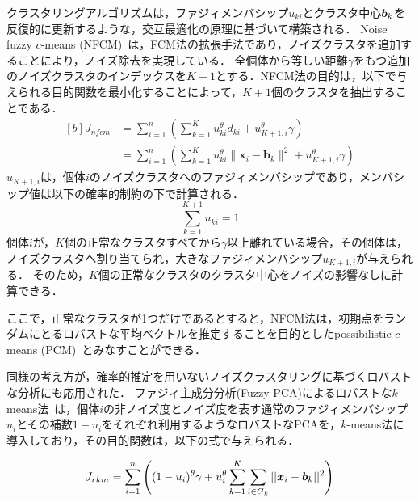 \documentclass{ujarticle}
\begin{document}
クラスタリングアルゴリズムは，ファジィメンバシップ$u_{ki}$とクラスタ中心$\mbox{\boldmath $b$}_k$を反復的に更新するような，交互最適化の原理に基づいて構築される．
Noise fuzzy $c$-means (NFCM)~\cite{Dave91,Dave97}は，FCM法の拡張手法であり，ノイズクラスタを追加することにより，ノイズ除去を実現している．
全個体から等しい距離$\gamma$をもつ追加のノイズクラスタのインデックスを$K+1$とする．NFCM法の目的は，以下で与えられる目的関数を最小化することによって，$K+1$個のクラスタを抽出することである．
\begin{equation}
\begin{aligned}[b]
J_{n f c m} &=\sum_{i=1}^{n}\left(\sum_{k=1}^{K} u_{k i}^{\theta} d_{k i}+u_{K+1, i}^{\theta} \gamma\right) \\
&=\sum_{i=1}^{n}\left(\sum_{k=1}^{K} u_{k i}^{\theta} \| \boldsymbol{x}_{i}-\boldsymbol{b}_{k} \|^{2}+u_{K+1, i}^{\theta} \gamma\right)
\end{aligned}
\label{eq: object NFCM}
\end{equation}
$u_{K+1, i}$は，個体$i$のノイズクラスタへのファジィメンバシップであり，メンバシップ値は以下の確率的制約の下で計算される．
\begin{equation}
	\sum_{k=1}^{K+1} u_{ki} = 1
\label{eq: sum-to-one condition for noise FCM}
\end{equation}
個体$i$が，$K$個の正常なクラスタすべてから$\gamma$以上離れている場合，その個体は，ノイズクラスタへ割り当てられ，大きなファジィメンバシップ$u_{K+1, i}$が与えられる．
そのため，$K$個の正常なクラスタのクラスタ中心をノイズの影響なしに計算できる．

ここで，正常なクラスタが1つだけであるとすると，NFCM法は，初期点をランダムにとるロバストな平均ベクトルを推定することを目的としたpossibilistic $c$-means (PCM)~\cite{Krishnapuram93}とみなすことができる．

同様の考え方が，確率的推定を用いないノイズクラスタリングに基づくロバストな分析にも応用された．
ファジィ主成分分析(Fuzzy PCA)によるロバストな$k$-means法~\cite{Honda2010_IEEE-TFS}は，個体$i$の非ノイズ度とノイズ度を表す通常のファジィメンバシップ$u_i$とその補数$1-u_i$をそれぞれ利用するようなロバストなPCAを，$k$-means法に導入しており，その目的関数は，以下の式で与えられる．

\begin{equation}
	J_{rkm} = \sum_{i=1}^n \left( (1-u_i)^\theta \gamma + u_i^\theta \sum_{k=1}^K \sum_{i \in G_k} || \mbox{\boldmath $x$}_i - \mbox{\boldmath $b$}_k||^2 \right)
\end{equation}
\end{document}

